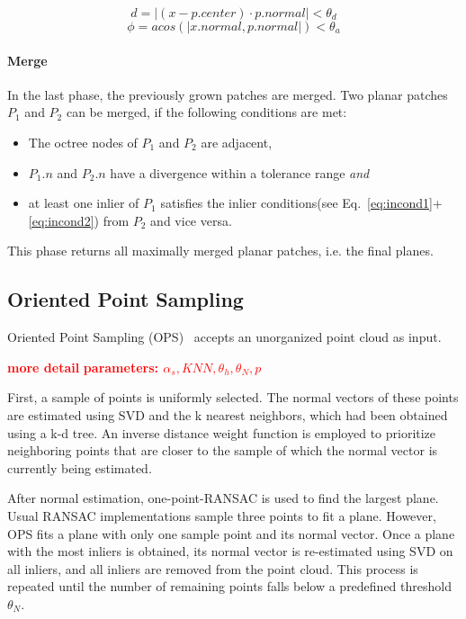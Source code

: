 \documentclass[main.tex]{subfiles}
\begin{document}
\begin{equation}
    \label{eq:incond1}
    d = |(x - p.center)\cdot p.normal| < \theta_d
\end{equation}
\begin{equation}
    \label{eq:incond2}
    \phi = acos(|x.normal, p.normal|) < \theta_a
\end{equation}

\paragraph*{Merge}
In the last phase, the previously grown patches are merged. Two planar patches $P_1$ and $P_2$ can be merged, if the following conditions are met:
\begin{itemize}
    \item The octree nodes of $P_1$ and $P_2$ are adjacent,
    \item $P_1.n$ and $P_2.n$ have a divergence within a tolerance range \textit{and}
    \item at least one inlier of $P_1$ satisfies the inlier conditions(see Eq.~\ref{eq:incond1}+\ref{eq:incond2}) from $P_2$ and vice versa.
\end{itemize}

This phase returns all maximally merged planar patches, i.e. the final planes.

\subsection{Oriented Point Sampling}
\label{subsec:bg-ops}
Oriented Point Sampling (OPS)~\cite{Sun_Mordohai_2019} accepts an unorganized point cloud as input.

\textbf{\textcolor{red}{more detail}}
\textbf{\textcolor{red}{parameters: $\alpha_s, KNN, \theta_h, \theta_N, p$}}

First, a sample of points is uniformly selected. The normal vectors of these points are estimated using SVD and the k nearest neighbors, which had been obtained using a k-d tree.
An inverse distance weight function is employed to prioritize neighboring points that are closer to the sample of which the normal vector is currently being estimated.


After normal estimation, one-point-RANSAC is used to find the largest plane. Usual RANSAC implementations sample three points to fit a plane. However, OPS fits a plane with only one sample point and its normal vector.
Once a plane with the most inliers is obtained, its normal vector is re-estimated using SVD on all inliers, and all inliers are removed from the point cloud.
This process is repeated until the number of remaining points falls below a predefined threshold $\theta_N$.
\end{document}
